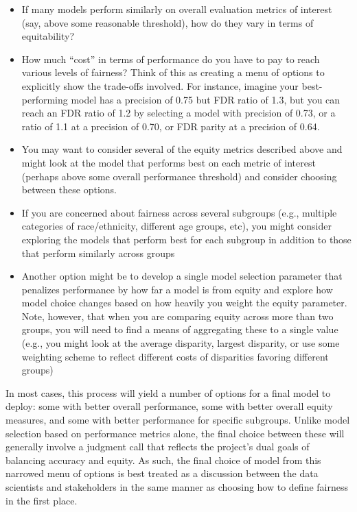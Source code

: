 \documentclass[]{krantz}
\begin{document}
\begin{itemize}
\item
  If many models perform similarly on overall evaluation metrics of
  interest (say, above some reasonable threshold), how do they vary in
  terms of equitability?
\item
  How much ``cost'' in terms of performance do you have to pay to reach
  various levels of fairness? Think of this as creating a menu of
  options to explicitly show the trade-offs involved. For instance,
  imagine your best-performing model has a precision of 0.75 but FDR
  ratio of 1.3, but you can reach an FDR ratio of 1.2 by selecting a
  model with precision of 0.73, or a ratio of 1.1 at a precision of
  0.70, or FDR parity at a precision of 0.64.
\item
  You may want to consider several of the equity metrics described above
  and might look at the model that performs best on each metric of
  interest (perhaps above some overall performance threshold) and
  consider choosing between these options.
\item
  If you are concerned about fairness across several subgroups (e.g.,
  multiple categories of race/ethnicity, different age groups, etc), you
  might consider exploring the models that perform best for each
  subgroup in addition to those that perform similarly across groups
\item
  Another option might be to develop a single model selection parameter
  that penalizes performance by how far a model is from equity and
  explore how model choice changes based on how heavily you weight the
  equity parameter. Note, however, that when you are comparing equity
  across more than two groups, you will need to find a means of
  aggregating these to a single value (e.g., you might look at the
  average disparity, largest disparity, or use some weighting scheme to
  reflect different costs of disparities favoring different groups)
\end{itemize}

In most cases, this process will yield a number of options for a final
model to deploy: some with better overall performance, some with better
overall equity measures, and some with better performance for specific
subgroups. Unlike model selection based on performance metrics alone,
the final choice between these will generally involve a judgment call
that reflects the project's dual goals of balancing accuracy and equity.
As such, the final choice of model from this narrowed menu of options is
best treated as a discussion between the data scientists and
stakeholders in the same manner as choosing how to define fairness in
the first place.
\end{document}
